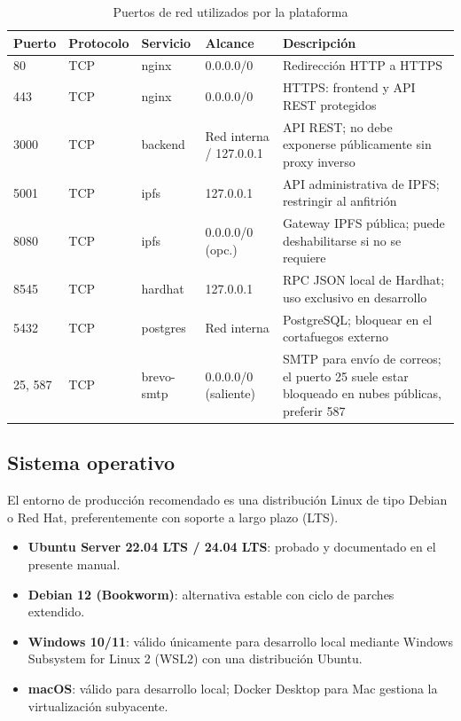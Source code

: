 \documentclass[11pt, a4paper]{article}
\begin{document}
\begin{table}[H]
\centering
\small
\renewcommand{\arraystretch}{1.4}
\begin{tabular}{@{}llllp{4.8cm}@{}}
\toprule
\textbf{Puerto} & \textbf{Protocolo} & \textbf{Servicio} & \textbf{Alcance} & \textbf{Descripci\'{o}n} \\
\midrule
80 & TCP & nginx & 0.0.0.0/0 & Redirecci\'{o}n HTTP a HTTPS \\
443 & TCP & nginx & 0.0.0.0/0 & HTTPS: frontend y API REST protegidos \\
3000 & TCP & backend & Red interna / 127.0.0.1 & API REST; no debe exponerse p\'{u}blicamente sin proxy inverso \\
5001 & TCP & ipfs & 127.0.0.1 & API administrativa de IPFS; restringir al anfitri\'{o}n \\
8080 & TCP & ipfs & 0.0.0.0/0 (opc.) & Gateway IPFS p\'{u}blica; puede deshabilitarse si no se requiere \\
8545 & TCP & hardhat & 127.0.0.1 & RPC JSON local de Hardhat; uso exclusivo en desarrollo \\
5432 & TCP & postgres & Red interna & PostgreSQL; bloquear en el cortafuegos externo \\
25, 587 & TCP & brevo-smtp & 0.0.0.0/0 (saliente) & SMTP para env\'{i}o de correos; el puerto 25 suele estar bloqueado en nubes p\'{u}blicas, preferir 587 \\
\bottomrule
\end{tabular}
\caption{Puertos de red utilizados por la plataforma}
\label{tab:req-ports}
\end{table}

\subsection{Sistema operativo}

El entorno de producci\'{o}n recomendado es una distribuci\'{o}n Linux de tipo Debian o Red Hat, preferentemente con soporte a largo plazo (LTS).

\begin{itemize}[leftmargin=*]
    \item \textbf{Ubuntu Server 22.04 LTS / 24.04 LTS}: probado y documentado en el presente manual.
    \item \textbf{Debian 12 (Bookworm)}: alternativa estable con ciclo de parches extendido.
    \item \textbf{Windows 10/11}: v\'{a}lido \'{u}nicamente para desarrollo local mediante Windows Subsystem for Linux 2 (WSL2) con una distribuci\'{o}n Ubuntu.
    \item \textbf{macOS}: v\'{a}lido para desarrollo local; Docker Desktop para Mac gestiona la virtualizaci\'{o}n subyacente.
\end{itemize}
\end{document}
